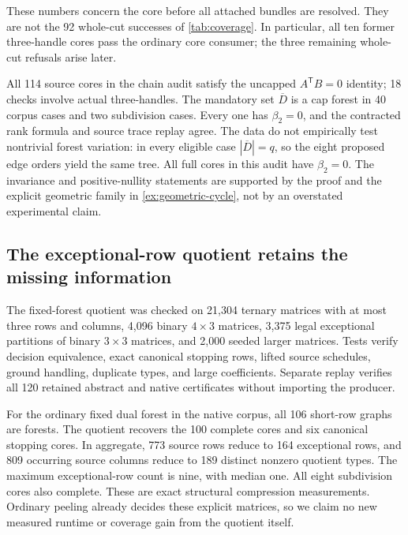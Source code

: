 These numbers concern the core before all attached bundles are resolved.
They are not the 92 whole-cut successes of \cref{tab:coverage}. In
particular, all ten former three-handle cores pass the ordinary core
consumer; the three remaining whole-cut refusals arise later.

All 114 source cores in the chain audit satisfy the uncapped
$A^{\mathsf T}B=0$ identity; 18 checks involve actual three-handles. The
mandatory set $\overline D$ is a cap forest in 40 corpus cases and two
subdivision cases. Every one has $\beta_2=0$, and the contracted rank
formula and source trace replay agree. The data do not empirically test
nontrivial forest variation: in every eligible case $|\overline D|=q$,
so the eight proposed edge orders yield the same tree. All full cores in
this audit have $\beta_2=0$. The invariance and positive-nullity statements
are supported by the proof and the explicit geometric family in
\cref{ex:geometric-cycle}, not by an overstated experimental claim.

\subsection{The exceptional-row quotient retains the missing information}

The fixed-forest quotient was checked on 21,304 ternary matrices with at
most three rows and columns, 4,096 binary $4\times3$ matrices, 3,375 legal
exceptional partitions of binary $3\times3$ matrices, and 2,000 seeded
larger matrices. Tests verify decision equivalence, exact canonical
stopping rows, lifted source schedules, ground handling, duplicate types,
and large coefficients. Separate replay verifies all 120 retained abstract
and native certificates without importing the producer.

For the ordinary fixed dual forest in the native corpus, all 106 short-row
graphs are forests. The quotient recovers the 100 complete cores and six
canonical stopping cores. In aggregate, 773 source rows reduce to 164
exceptional rows, and 809 occurring source columns reduce to 189 distinct
nonzero quotient types. The maximum exceptional-row count is nine, with
median one. All eight subdivision cores also complete. These are exact
structural compression measurements. Ordinary peeling already decides
these explicit matrices, so we claim no new measured runtime or coverage
gain from the quotient itself.
